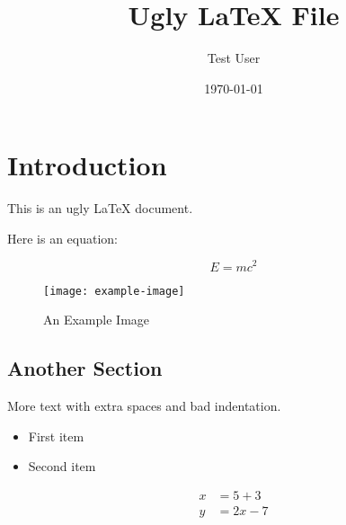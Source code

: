 \documentclass{article} \usepackage{graphicx, amsmath}
\begin{document}
 \title{Ugly LaTeX  File} \author{Test User}
\date{\today}\maketitle

\section{Introduction} This is  an  ugly LaTeX document.

Here is an equation:

\[   E= mc^2   \]

\begin{figure}\centering\texttt{[image: example-image]}
  \caption{An Example Image}\label{fig:example}
\end{figure}

\subsection{Another Section}More text  with  extra spaces  and bad indentation.

\begin{itemize}
  \item First  item
  \item Second  item
\end{itemize}

\begin{align} x & = 5 +  3    \\
  y & =    2x  -7
\end{align}
\end{document}
